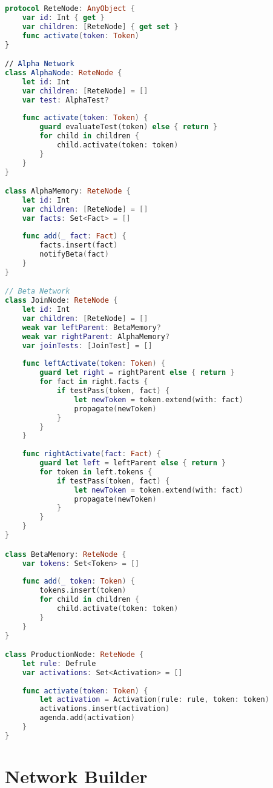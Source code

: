 \begin{lstlisting}[language=Swift]
protocol ReteNode: AnyObject {
    var id: Int { get }
    var children: [ReteNode] { get set }
    func activate(token: Token)
}

// Alpha Network
class AlphaNode: ReteNode {
    let id: Int
    var children: [ReteNode] = []
    var test: AlphaTest?
    
    func activate(token: Token) {
        guard evaluateTest(token) else { return }
        for child in children {
            child.activate(token: token)
        }
    }
}

class AlphaMemory: ReteNode {
    let id: Int
    var children: [ReteNode] = []
    var facts: Set<Fact> = []
    
    func add(_ fact: Fact) {
        facts.insert(fact)
        notifyBeta(fact)
    }
}

// Beta Network
class JoinNode: ReteNode {
    let id: Int
    var children: [ReteNode] = []
    weak var leftParent: BetaMemory?
    weak var rightParent: AlphaMemory?
    var joinTests: [JoinTest] = []
    
    func leftActivate(token: Token) {
        guard let right = rightParent else { return }
        for fact in right.facts {
            if testPass(token, fact) {
                let newToken = token.extend(with: fact)
                propagate(newToken)
            }
        }
    }
    
    func rightActivate(fact: Fact) {
        guard let left = leftParent else { return }
        for token in left.tokens {
            if testPass(token, fact) {
                let newToken = token.extend(with: fact)
                propagate(newToken)
            }
        }
    }
}

class BetaMemory: ReteNode {
    var tokens: Set<Token> = []
    
    func add(_ token: Token) {
        tokens.insert(token)
        for child in children {
            child.activate(token: token)
        }
    }
}

class ProductionNode: ReteNode {
    let rule: Defrule
    var activations: Set<Activation> = []
    
    func activate(token: Token) {
        let activation = Activation(rule: rule, token: token)
        activations.insert(activation)
        agenda.add(activation)
    }
}
\end{lstlisting}

\section{Network Builder}

